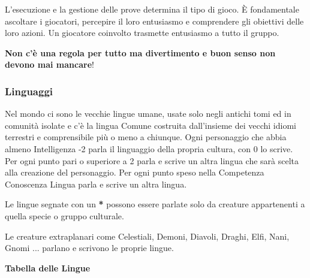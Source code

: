 \begin{multicols}{2}
\begin{narratore}
	L'esecuzione e la gestione delle prove determina il tipo di gioco. È fondamentale ascoltare i giocatori, percepire il loro entusiasmo e comprendere gli obiettivi delle loro azioni. Un giocatore coinvolto trasmette entusiasmo a tutto il gruppo.


	\textbf{Non c'è una regola per tutto ma divertimento e buon senso non devono mai mancare}!
\end{narratore}


\titlespacing*{\subsubsection}{0pt}{0.5em}{0.5em}\subsubsection*{Linguaggi}\hypertarget{linguaggi}{}\label{linguaggi}

Nel mondo ci sono le vecchie lingue umane, usate solo negli antichi tomi ed in comunità isolate e c'è la lingua Comune costruita dall'insieme dei vecchi idiomi terrestri e comprensibile più o meno a chiunque. Ogni personaggio che abbia almeno Intelligenza -2 parla il linguaggio della propria cultura, con 0 lo scrive. Per ogni punto pari o superiore a 2 parla e scrive un altra lingua che sarà scelta alla creazione del personaggio. Per ogni punto speso nella Competenza Conoscenza Lingua parla e scrive un altra lingua.

Le lingue segnate con un \textbf{*} possono essere parlate solo da creature appartenenti a quella specie o gruppo culturale.

Le creature extraplanari come Celestiali, Demoni, Diavoli, Draghi, Elfi, Nani, Gnomi ... parlano e scrivono le proprie lingue.

\smallskip

\textbf{Tabella delle Lingue}

\smallskip


\end{multicols}
